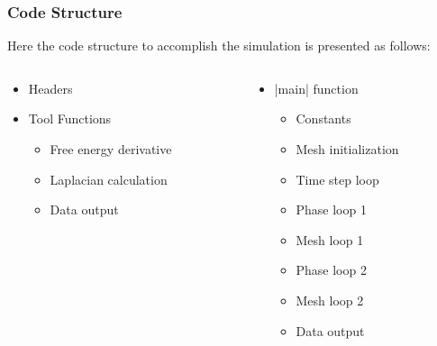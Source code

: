 \documentclass[compress,xcolor={dvipsnames}]{beamer}
\begin{document}
\begin{frame}[fragile]
    \frametitle{Code Structure}

    Here the code structure to accomplish the simulation is presented as follows:
    \begin{columns}
        \begin{column}{.5\linewidth}
            \begin{itemize}
                \item Headers
                \item Tool Functions
                      \begin{itemize}
                          \item Free energy derivative
                          \item Laplacian calculation
                          \item Data output
                      \end{itemize}
            \end{itemize}
        \end{column}
        \hspace{-20pt}
        \begin{column}{.5\linewidth}
            \begin{itemize}
                \item \cverb|main| function
                      \begin{itemize}
                          \item Constants
                          \item Mesh initialization
                          \item Time step loop
                          \item Phase loop 1
                          \item Mesh loop 1
                          \item Phase loop 2
                          \item Mesh loop 2
                          \item Data output
                      \end{itemize}
            \end{itemize}
        \end{column}
    \end{columns}

\end{frame}
\end{document}
